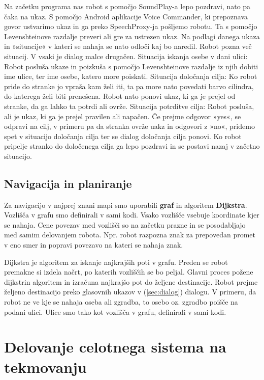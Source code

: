 \documentclass[a4paper,11pt]{article}
\begin{document}
Na začetku programa nas robot s pomočjo SoundPlay-a lepo pozdravi, nato pa čaka na ukaz. S pomočjo Android aplikacije Voice Commander, ki prepoznava govor ustvarimo ukaz in ga preko SpeechProxy-ja pošljemo robotu. Ta s pomočjo Levenshteinove razdalje preveri ali gre za ustrezen ukaz. Na podlagi danega ukaza in »situacije« v kateri se nahaja se nato odloči kaj bo naredil. Robot pozna več situacij. V vsaki je dialog malce drugačen. 
Situacija iskanja osebe v dani ulici: Robot posluša ukaze in poizkuša s pomočjo Levenshteinove razdalje iz njih dobiti ime ulice, ter ime osebe, katero more poiskati.
Situacija določanja cilja: Ko robot pride do stranke jo vpraša kam želi iti, ta pa more nato povedati barvo cilindra, do katerega želi biti prenešena. Robot nato ponovi ukaz, ki ga je prejel od stranke, da ga lahko ta potrdi ali ovrže. 
Situacija potrditve cilja: Robot posluša, ali je ukaz, ki ga je prejel pravilen ali napačen. Če prejme odgovor »yes«, se odpravi na cilj, v primeru pa da stranka ovrže uakz in odgovori z »no«, pridemo spet v situacijo določanja cilja ter se dialog določanja cilja ponovi. Ko robot pripelje stranko do določenega cilja ga lepo pozdravi in se postavi nazaj v začetno situacijo.

\subsection{Navigacija in planiranje}

Za navigacijo v najprej znani mapi smo uporabili \textbf{graf} in algoritem \textbf{Dijkstra}. Vozlišča v grafu smo definirali v sami kodi. Vsako vozlišče vsebuje koordinate kjer se nahaja. Cene povezav med vozlišči so na začetku prazne in se posodabljajo med samim delovanjem robota. Npr. robot razpozna znak za prepovedan promet
v eno smer in popravi povezavo na kateri se nahaja znak.

Dijkstra je algoritem za iskanje najkrajših poti v grafu. Preden se robot premakne si izdela načrt, po katerih vozliščih se bo peljal. Glavni proces požene dijkstrin algoritem in izračuna najkrajšo pot do željene destinacije. Robot prejme željeno destinacijo preko glasovnih ukazov v (\ref{sec:dialog}{}) dialogu. V primeru, da robot ne ve kje se nahaja oseba ali zgradba, to osebo oz. zgradbo poišče na podani ulici. Ulice smo tako kot vozlišča v grafu, definirali v sami kodi.

\section{Delovanje celotnega sistema na tekmovanju}
\end{document}
